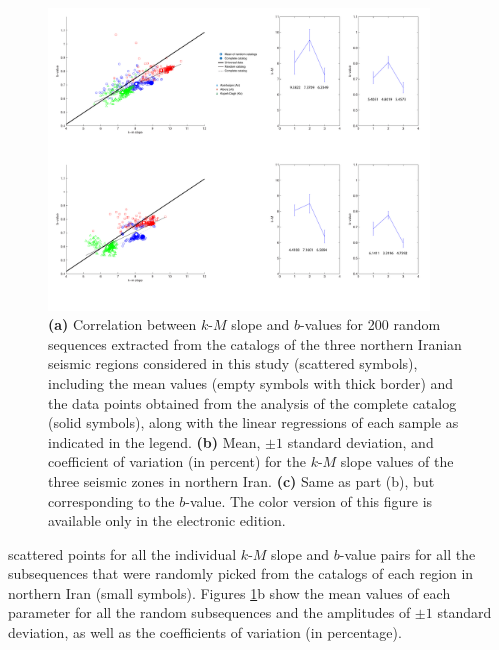 \begin{figure}%
	\centering
	\includegraphics[width=0.9\textwidth]{figures/pdf/figure-08-rev.pdf} 
	\caption{\textbf{(a)} Correlation between $k$-$M$ slope and $b$-values for 200 random sequences extracted from the  catalogs of the three northern Iranian seismic regions considered in this study (scattered symbols), including the mean values (empty symbols with thick border) and the data points obtained from the analysis of the complete catalog (solid symbols), along with the linear regressions of each sample as indicated in the legend. \textbf{(b)} Mean, $\pm1$ standard deviation, and coefficient of variation (in percent) for the $k$-$M$ slope values of the three seismic zones in northern Iran. \textbf{(c)} Same as part (b), but corresponding to the $b$-value. The color version of this figure is available only in the electronic edition.}
	\label{fig:random}
\end{figure}

 scattered points for all the individual $k$-$M$ slope and $b$-value pairs for all the subsequences that were randomly picked from the  catalogs of each region in northern Iran (small symbols). Figures \ref{fig:random}b  show the mean values of each parameter for all the random subsequences and the amplitudes of $\pm 1$ standard deviation, as well as the coefficients of variation (in percentage). 


